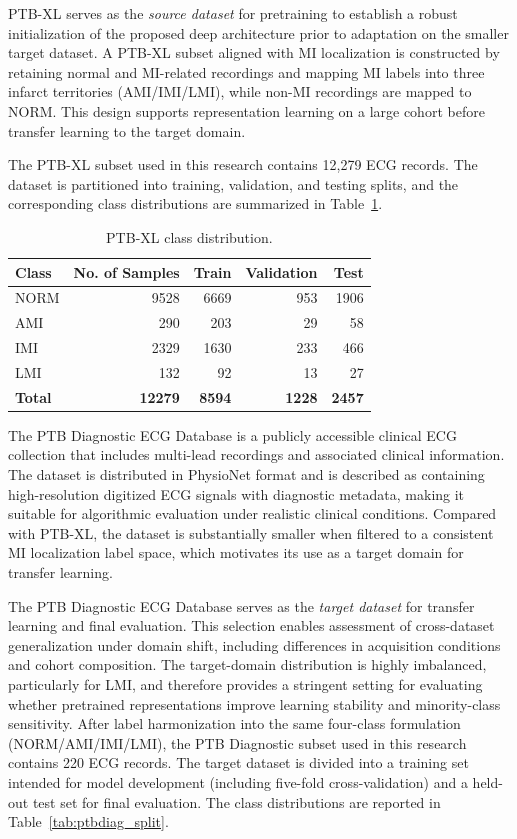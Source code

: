 \documentclass[preprint,12pt]{elsarticle}
\begin{document}
PTB-XL serves as the \emph{source dataset} for pretraining to establish a robust initialization of the proposed deep architecture prior to adaptation on the smaller target dataset. A PTB-XL subset aligned with MI localization is constructed by retaining normal and MI-related recordings and mapping MI labels into three infarct territories (AMI/IMI/LMI), while non-MI recordings are mapped to NORM. This design supports representation learning on a large cohort before transfer learning to the target domain.

The PTB-XL subset used in this research contains 12{,}279 ECG records. The dataset is partitioned into training, validation, and testing splits, and the corresponding class distributions are summarized in Table~\ref{tab:ptbxl_split}.

\begin{table}[!t]
\centering
\caption{PTB-XL class distribution.}
\label{tab:ptbxl_split}
\begin{tabular}{l r r r r}
\hline
\textbf{Class} & \textbf{No. of Samples} & \textbf{Train} & \textbf{Validation} & \textbf{Test} \\
\hline
NORM & 9528 & 6669 & 953 & 1906 \\
AMI  & 290  & 203  & 29  & 58   \\
IMI  & 2329 & 1630 & 233 & 466  \\
LMI  & 132  & 92   & 13  & 27   \\
\hline
\textbf{Total} & \textbf{12279} & \textbf{8594} & \textbf{1228} & \textbf{2457} \\
\hline
\end{tabular}
\end{table}

The PTB Diagnostic ECG Database is a publicly accessible clinical ECG collection that includes multi-lead recordings and associated clinical information. The dataset is distributed in PhysioNet format and is described as containing high-resolution digitized ECG signals with diagnostic metadata, making it suitable for algorithmic evaluation under realistic clinical conditions. Compared with PTB-XL, the dataset is substantially smaller when filtered to a consistent MI localization label space, which motivates its use as a target domain for transfer learning.

The PTB Diagnostic ECG Database serves as the \emph{target dataset} for transfer learning and final evaluation. This selection enables assessment of cross-dataset generalization under domain shift, including differences in acquisition conditions and cohort composition. The target-domain distribution is highly imbalanced, particularly for LMI, and therefore provides a stringent setting for evaluating whether pretrained representations improve learning stability and minority-class sensitivity. After label harmonization into the same four-class formulation (NORM/AMI/IMI/LMI), the PTB Diagnostic subset used in this research contains 220 ECG records. The target dataset is divided into a training set intended for model development (including five-fold cross-validation) and a held-out test set for final evaluation. The class distributions are reported in Table~\ref{tab:ptbdiag_split}.
\end{document}
